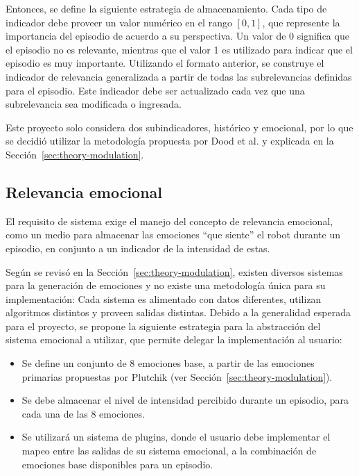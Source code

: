 Entonces, se define la siguiente estrategia de almacenamiento. Cada tipo de indicador debe proveer un valor numérico en el rango $[0, 1]$, que represente la importancia del episodio de acuerdo a su perspectiva. Un valor de 0 significa que el episodio no es relevante, mientras que el valor 1 es utilizado para indicar que el episodio es muy importante. Utilizando el formato anterior, se construye el indicador de relevancia generalizada a partir de todas las subrelevancias definidas para el episodio. Este indicador debe ser actualizado cada vez que una subrelevancia sea modificada o ingresada.

Este proyecto solo considera dos subindicadores, histórico y emocional, por lo que se decidió utilizar la metodología propuesta por Dood et al. y explicada en la Sección~\ref{sec:theory-modulation}.


\subsection{Relevancia emocional}\label{sec:design_ep_rel_emo}

El requisito de sistema  exige el manejo del concepto de relevancia emocional, como un medio para almacenar las emociones ``que siente'' el robot durante un episodio, en conjunto a un indicador de la intensidad de estas.


Según se revisó en la Sección~\ref{sec:theory-modulation}, existen diversos sistemas para la generación de emociones y no existe una metodología única para su implementación: Cada sistema es alimentado con datos diferentes, utilizan algoritmos distintos y proveen salidas distintas. Debido a la generalidad esperada para el proyecto, se propone la siguiente estrategia para la abstracción del sistema emocional a utilizar, que permite delegar la implementación al usuario:
\begin{itemize}
\item Se define un conjunto de 8 emociones base, a partir de las emociones primarias propuestas por Plutchik (ver Sección~\ref{sec:theory-modulation}).
\item Se debe almacenar el nivel de intensidad percibido durante un episodio, para cada una de las 8 emociones.
\item Se utilizará un sistema de plugins, donde el usuario debe implementar el mapeo entre las salidas de su sistema emocional, a la combinación de emociones base disponibles para un episodio.
\end{itemize}

